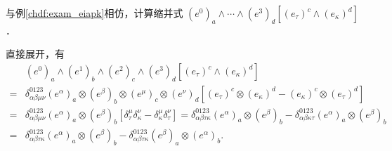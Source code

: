 

\begin{example}\label{chdf:exam_eiapkl}
	与例\ref{chdf:exam_eiapk}相仿，计算缩并式
	$(e^{0})_{a} \wedge \cdots \wedge (e^{3})_{d} \left[(e_\tau)^{c}\wedge(e_\kappa)^{d}\right]$．
\end{example}
直接展开，有
\begin{align*}
	&(e^{0})_{a} \wedge (e^{1})_{b} \wedge (e^{2})_{c} \wedge (e^{3})_{d} 
	\left[(e_\tau)^{c}\wedge(e_\kappa)^{d}\right] \\
	=& \delta^{0123}_{\alpha\beta\mu\nu} 
	(e^{\alpha})_{a} \otimes (e^{\beta})_{b} \otimes (e^{\mu})_{c} \otimes (e^{\nu})_{d} 
	\left[(e_\tau)^{c}\otimes (e_\kappa)^{d} -(e_\kappa)^{c}\otimes (e_\tau)^{d}\right] \\
	=& \delta^{0123}_{\alpha\beta\mu\nu} (e^{\alpha})_{a} \otimes (e^{\beta})_{b}  
	\left[\delta_{\tau}^{\mu} \delta_{\kappa}^{\nu}	- \delta_{\kappa}^{\mu}\delta_{\tau}^{\nu} \right]
	=\delta^{0123}_{\alpha\beta\tau\kappa}(e^{\alpha})_{a} \otimes (e^{\beta})_{b} 
	-\delta^{0123}_{\alpha\beta\kappa\tau}(e^{\alpha})_{a} \otimes (e^{\beta})_{b} \\
	=&\delta^{0123}_{\alpha\beta\tau\kappa}(e^{\alpha})_{a} \otimes (e^{\beta})_{b} 
	-\delta^{0123}_{\alpha\beta\tau\kappa}(e^{\beta})_{a} \otimes (e^{\alpha})_{b} .
\end{align*}

